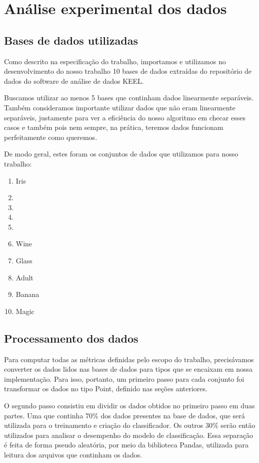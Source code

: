 \documentclass{article}
\begin{document}
\section{Análise experimental dos dados}

\subsection{Bases de dados utilizadas}

Como descrito na especificação do trabalho, importamos e utilizamos no desenvolvimento do nosso trabalho 10 bases de dados extraídas do repositório de dados do software de análise de dados KEEL.

Buscamos utilizar ao menos 5 bases que continham dados linearmente separáveis. Também consideramos importante utilizar dados que não eram linearmente separáveis, justamente para ver a eficiência do nosso algoritmo em checar esses casos e também pois nem sempre, na prática, teremos dados funcionam perfeitamente como queremos.

De modo geral, estes foram os conjuntos de dados que utilizamos para nosso trabalho:

\begin{enumerate}
	\item Iris
	\item
	\item
	\item
	\item
	\item Wine
	\item Glass
	\item Adult
	\item Banana
	\item Magic

\end{enumerate}

\subsection{Processamento dos dados}

Para computar todas as métricas definidas pelo escopo do trabalho, precisávamos converter os dados lidos nas bases de dados para tipos que se encaixam em nossa implementação. Para isso, portanto, um primeiro passo para cada conjunto foi transformar os dados no tipo Point, definido nas seções anteriores.

O segundo passo consistiu em dividir os dados obtidos no primeiro passo em duas partes. Uma que continha 70\% dos dados presentes na base de dados, que será utilizada para o treinamento e criação do classificador. Os outros 30\% serão então utilizados para analisar o desempenho do modelo de classificação. Essa separação é feita de forma pseudo aleatória, por meio da biblioteca Pandas, utilizada para leitura dos arquivos que continham os dados.
\end{document}
